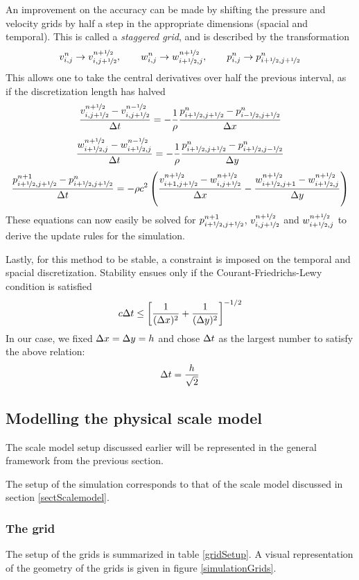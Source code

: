 An improvement on the accuracy can be made by shifting the pressure and velocity grids by half a step in the appropriate dimensions (spacial and temporal). This is called a \emph{staggered grid}\cite{staggered-grid}, and is described by the transformation
$$
v_{i,j}^n \to v_{i,j+\nicefrac{1}{2}}^{n+\nicefrac{1}{2}}
, \qquad
w_{i,j}^n \to w_{i+\nicefrac{1}{2},j}^{n+\nicefrac{1}{2}}
, \qquad
p_{i,j}^n \to p^n_{i+\nicefrac{1}{2}, j+\nicefrac{1}{2}}
$$
This allows one to take the central derivatives over half the previous interval, as if the discretization length has halved
{\small 
$$
\frac{v_{i,j+\nicefrac{1}{2}}^{n+\nicefrac{1}{2}} - v_{i,j+\nicefrac{1}{2}}^{n-\nicefrac{1}{2}}}{\Delta t}
	= -\frac{1}{\rho} \frac{p^n_{i+\nicefrac{1}{2},j+\nicefrac{1}{2}} - p^n_{i-\nicefrac{1}{2},j+\nicefrac{1}{2}}}{\Delta x}
$$
$$
\frac{w_{i+\nicefrac{1}{2},j}^{n+\nicefrac{1}{2}} - w_{i+\nicefrac{1}{2},j}^{n-\nicefrac{1}{2}}}{\Delta t}
	= -\frac{1}{\rho} \frac{p^n_{i+\nicefrac{1}{2},j+\nicefrac{1}{2}} - p^n_{i+\nicefrac{1}{2},j-\nicefrac{1}{2}}}{\Delta y}
$$
$$
\frac{p_{i+\nicefrac{1}{2},j+\nicefrac{1}{2}}^{n+1} - p_{i+\nicefrac{1}{2},j+\nicefrac{1}{2}}^{n}}{\Delta t} = 
	-\rho c^2 \left(
		\frac{v_{i+1,j+\nicefrac{1}{2}}^{n+\nicefrac{1}{2}} 
			- w_{i,j+\nicefrac{1}{2}}^{n+\nicefrac{1}{2}}}{\Delta x}
		- \frac{w_{i+\nicefrac{1}{2},j+1}^{n+\nicefrac{1}{2}} 
			- w_{i+\nicefrac{1}{2},j}^{n+\nicefrac{1}{2}}}{\Delta y}
	\right)
$$}
These equations can now easily be solved for $p^{n+1}_{i+\nicefrac{1}{2}, j+\nicefrac{1}{2}}$, $v_{i,j+\nicefrac{1}{2}}^{n+\nicefrac{1}{2}}$ and $w_{i+\nicefrac{1}{2},j}^{n+\nicefrac{1}{2}}$ to derive the update rules for the simulation.

Lastly, for this method to be stable, a constraint is imposed on the temporal and spacial discretization. Stability ensues only if the Courant-Friedrichs-Lewy condition is satisfied\cite{courant-friedrichs-lewy, numerical-stability-2D-FDTD}
$$
c\Delta t \leq \left[\frac{1}{(\Delta x)^2} + \frac{1}{(\Delta y)^2}\right] ^ {-1/2}
$$
In our case, we fixed $\Delta x = \Delta y = h$ and chose $\Delta t$ as the largest number to satisfy the above relation:
$$
\Delta t = \frac{h}{\sqrt{2}}
$$


\subsection{Modelling the physical scale model}
The scale model setup discussed earlier will be represented in the general framework from the previous section.

The setup of the simulation corresponds to that of the scale model discussed in section \ref{sectScalemodel}. 

\subsubsection{The grid}
The setup of the grids is summarized in table \ref{gridSetup}. A visual representation of the geometry of the grids is given in figure \ref{simulationGrids}.

